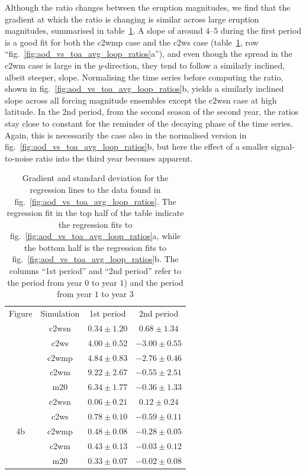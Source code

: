 \documentclass{ametsocV6.1}
\begin{document}
Although the ratio changes between the eruption magnitudes, we find that the gradient at
which the ratio is changing is similar across large eruption magnitudes, summarised in
table~\ref{tab:slope-gradients}. A slope of around \(4\)--\(5\) during the first period
is a good fit for both the \gls{c2wmp} case and the \gls{c2ws} case
(table~\ref{tab:slope-gradients}, row ``fig.~\ref{fig:aod_vs_toa_avg_loop_ratios}a''),
and even though the spread in the \gls{c2wm} case is large in the \(y\)-direction, they
tend to follow a similarly inclined, albeit steeper, slope. Normalising the time series
before computing the ratio, shown in fig.~\ref{fig:aod_vs_toa_avg_loop_ratios}b, yields
a similarly inclined slope across all forcing magnitude ensembles except the \gls{c2wsn}
case at high latitude. In the 2nd period, from the second season of the second year, the
ratios stay close to constant for the reminder of the decaying phase of the time series.
Again, this is necessarily the case also in the normalised version in
fig.~\ref{fig:aod_vs_toa_avg_loop_ratios}b, but here the effect of a smaller
signal-to-noise ratio into the third year becomes apparent.

\begin{table}
  \centering

  \caption{Gradient and standard deviation for the regression lines to the data found in
    fig.~\ref{fig:aod_vs_toa_avg_loop_ratios}. The regression fit in the top half of the
    table indicate the regression fits to fig.~\ref{fig:aod_vs_toa_avg_loop_ratios}a, while
    the bottom half is the regression fits to fig.~\ref{fig:aod_vs_toa_avg_loop_ratios}b.
    The columns ``1st period'' and ``2nd period'' refer to the period from year \(0\) to
    year \(1\)) and the period from year \(1\) to year \(3\)}\label{tab:slope-gradients}%
  \begin{tabular}{cccc}
    Figure               & Simulation  & 1st period      & 2nd period       \\
    \rowcolor{LightGray} & \gls{c2wsn} & \(0.34\pm1.20\) & \(0.68\pm1.34\)  \\
    \rowcolor{LightGray} & \gls{c2ws}  & \(4.00\pm0.52\) & \(-3.00\pm0.55\) \\
    \rowcolor{LightGray} & \gls{c2wmp} & \(4.84\pm0.83\) & \(-2.76\pm0.46\) \\
    \rowcolor{LightGray} & \gls{c2wm}  & \(9.22\pm2.67\) & \(-0.55\pm2.51\) \\
    \rowcolor{LightGray} & \gls{m20}   & \(6.34\pm1.77\) & \(-0.36\pm1.33\) \\
    \multirow{5}{*}{4b}  & \gls{c2wsn} & \(0.06\pm0.21\) & \(0.12\pm0.24\)  \\
    \multirow{-9}{*}{4a} & \gls{c2ws}  & \(0.78\pm0.10\) & \(-0.59\pm0.11\) \\
                         & \gls{c2wmp} & \(0.48\pm0.08\) & \(-0.28\pm0.05\) \\
                         & \gls{c2wm}  & \(0.43\pm0.13\) & \(-0.03\pm0.12\) \\
                         & \gls{m20}   & \(0.33\pm0.07\) & \(-0.02\pm0.08\) \\
  \end{tabular}
\end{table}
\end{document}
